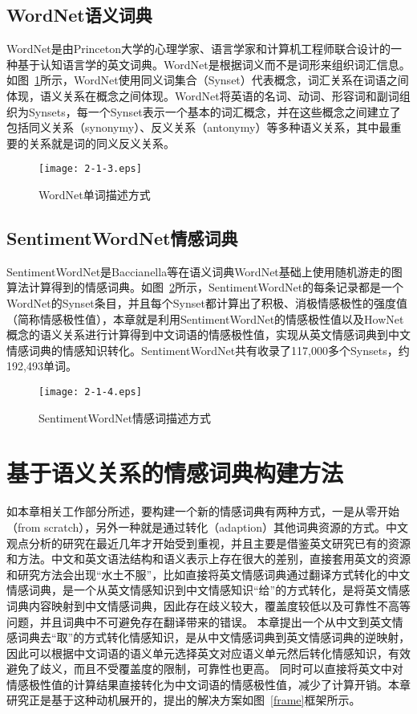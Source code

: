 \subsection{WordNet语义词典}
WordNet是由Princeton大学的心理学家、语言学家和计算机工程师联合设计的一种基于认知语言学的英文词典。WordNet是根据词义而不是词形来组织词汇信息。如图~\ref{fig2-2-3}所示，WordNet使用同义词集合（Synset）代表概念，词汇关系在词语之间体现，语义关系在概念之间体现。WordNet将英语的名词、动词、形容词和副词组织为Synsets，每一个Synset表示一个基本的词汇概念，并在这些概念之间建立了包括同义关系（synonymy）、反义关系（antonymy）等多种语义关系，其中最重要的关系就是词的同义反义关系。

\begin{figure}[htp]
\centering
\texttt{[image: 2-1-3.eps]}
\caption{WordNet单词描述方式}
\label{fig2-2-3}
\end{figure}

\subsection{SentimentWordNet情感词典}
SentimentWordNet是Baccianella等在语义词典WordNet基础上使用随机游走的图算法计算得到的情感词典。如图~\ref{fig2-2-4}所示，SentimentWordNet的每条记录都是一个WordNet的Synset条目，并且每个Synset都计算出了积极、消极情感极性的强度值（简称情感极性值），本章就是利用SentimentWordNet的情感极性值以及HowNet概念的语义关系进行计算得到中文词语的情感极性值，实现从英文情感词典到中文情感词典的情感知识转化。SentimentWordNet共有收录了117,000多个Synsets，约192,493单词。

\begin{figure}[htp]
\centering
\texttt{[image: 2-1-4.eps]}
\caption{SentimentWordNet情感词描述方式}
\label{fig2-2-4}
\end{figure}

\section{基于语义关系的情感词典构建方法}
如本章相关工作部分所述，要构建一个新的情感词典有两种方式，一是从零开始（from scratch），另外一种就是通过转化（adaption）其他词典资源的方式。中文观点分析的研究在最近几年才开始受到重视，并且主要是借鉴英文研究已有的资源和方法。中文和英文语法结构和语义表示上存在很大的差别，直接套用英文的资源和研究方法会出现“水土不服”，比如直接将英文情感词典通过翻译方式转化的中文情感词典，是一个从英文情感知识到中文情感知识“给”的方式转化，是将英文情感词典内容映射到中文情感词典，因此存在歧义较大，覆盖度较低以及可靠性不高等问题，并且词典中不可避免存在翻译带来的错误。
本章提出一个从中文到英文情感词典去“取”的方式转化情感知识，是从中文情感词典到英文情感词典的逆映射，因此可以根据中文词语的语义单元选择英文对应语义单元然后转化情感知识，有效避免了歧义，而且不受覆盖度的限制，可靠性也更高。
同时可以直接将英文中对情感极性值的计算结果直接转化为中文词语的情感极性值，减少了计算开销。本章研究正是基于这种动机展开的，提出的解决方案如图~\ref{frame}框架所示。

